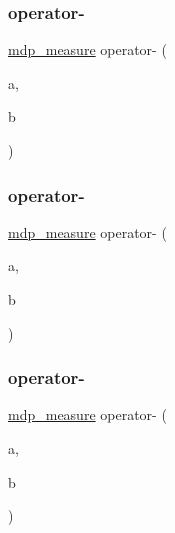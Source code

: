 \mbox{\label{classmdp__measure_a4b29a5d9a8875501a415f73167d8c1ad}} 
\subsubsection{\texorpdfstring{operator-\/}{operator-}\hspace{0.1cm}{\footnotesize\ttfamily [1/3]}}
{\footnotesize\ttfamily \hyperlink{classmdp__measure}{mdp\+\_\+measure} operator-\/ (\begin{DoxyParamCaption}\item[{\hyperlink{classmdp__measure}{mdp\+\_\+measure}}]{a,  }\item[{\hyperlink{classmdp__measure}{mdp\+\_\+measure}}]{b }\end{DoxyParamCaption})\hspace{0.3cm}{\ttfamily [friend]}}

\mbox{\label{classmdp__measure_ad0854fb690a3213c1263755d4cfbeb29}} 
\subsubsection{\texorpdfstring{operator-\/}{operator-}\hspace{0.1cm}{\footnotesize\ttfamily [2/3]}}
{\footnotesize\ttfamily \hyperlink{classmdp__measure}{mdp\+\_\+measure} operator-\/ (\begin{DoxyParamCaption}\item[{float}]{a,  }\item[{\hyperlink{classmdp__measure}{mdp\+\_\+measure}}]{b }\end{DoxyParamCaption})\hspace{0.3cm}{\ttfamily [friend]}}

\mbox{\label{classmdp__measure_aa1d61cccc59a965eedf6ecb2fb877ea0}} 
\subsubsection{\texorpdfstring{operator-\/}{operator-}\hspace{0.1cm}{\footnotesize\ttfamily [3/3]}}
{\footnotesize\ttfamily \hyperlink{classmdp__measure}{mdp\+\_\+measure} operator-\/ (\begin{DoxyParamCaption}\item[{\hyperlink{classmdp__measure}{mdp\+\_\+measure}}]{a,  }\item[{float}]{b }\end{DoxyParamCaption})\hspace{0.3cm}{\ttfamily [friend]}}

